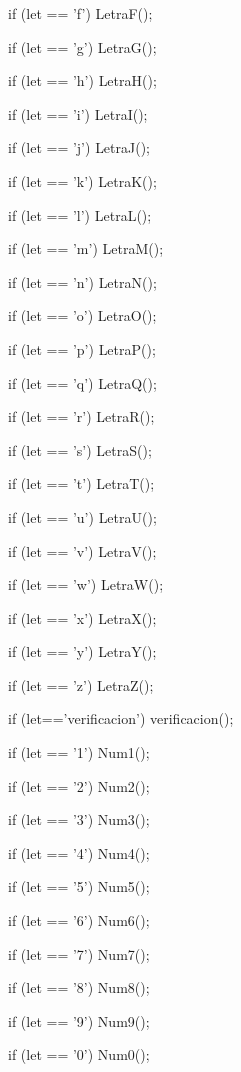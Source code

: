 \documentclass{article}
\begin{document}
  if (let == 'f') {
    LetraF();}

  if (let == 'g') {
    LetraG();}

  if (let == 'h') {
    LetraH();}

  if (let == 'i') {
    LetraI();}

  if (let == 'j') {
    LetraJ();}

  if (let == 'k') {
    LetraK();}

  if (let == 'l') {
    LetraL();}

  if (let == 'm') {
    LetraM();}

  if (let == 'n') {
    LetraN();}

  if (let == 'o') {
    LetraO();}

  if (let == 'p') {
    LetraP();}

  if (let == 'q') {
    LetraQ();}

   if (let == 'r') {
    LetraR();}

  if (let == 's') {
    LetraS();}

  if (let == 't') {
    LetraT();}

  if (let == 'u') {
    LetraU();}

  if (let == 'v') {
    LetraV();}

  if (let == 'w') {
    LetraW();}

  if (let == 'x') {
    LetraX();}

  if (let == 'y') {
    LetraY();}

  if (let == 'z') {
    LetraZ();}

  if (let=='verificacion'){
    verificacion();}


  if (let == '1'){
    Num1();}
  
  if (let == '2'){
    Num2();}
  
  if (let == '3'){
    Num3();}
  
  if (let == '4'){
    Num4();}
  
  if (let == '5'){
    Num5();}
  
  if (let == '6'){
    Num6();}
  
  if (let == '7'){
    Num7();}
  
  if (let == '8'){
    Num8();}
  
  if (let == '9'){
    Num9();}
  
  if (let == '0'){
    Num0();}
  
\end{document}
